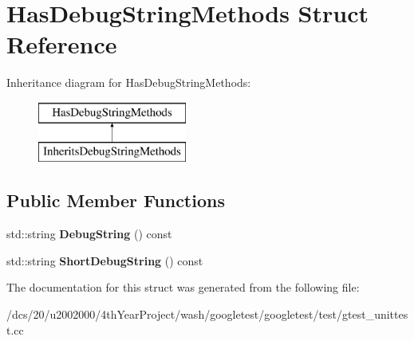 \hypertarget{structHasDebugStringMethods}{}\section{Has\+Debug\+String\+Methods Struct Reference}
\label{structHasDebugStringMethods}
Inheritance diagram for Has\+Debug\+String\+Methods\+:\begin{figure}[H]
\begin{center}
\leavevmode
\includegraphics[height=2.000000cm]{structHasDebugStringMethods}
\end{center}
\end{figure}
\subsection*{Public Member Functions}
\begin{DoxyCompactItemize}
\item 
\mbox{\label{structHasDebugStringMethods_a906f4596e4715fb1df7773d5a012e5e5}} 
std\+::string {\bfseries Debug\+String} () const
\item 
\mbox{\label{structHasDebugStringMethods_a607b14207e5fdb9f12071f1e89542a3b}} 
std\+::string {\bfseries Short\+Debug\+String} () const
\end{DoxyCompactItemize}


The documentation for this struct was generated from the following file\+:\begin{DoxyCompactItemize}
\item 
/dcs/20/u2002000/4th\+Year\+Project/wash/googletest/googletest/test/gtest\+\_\+unittest.\+cc\end{DoxyCompactItemize}
